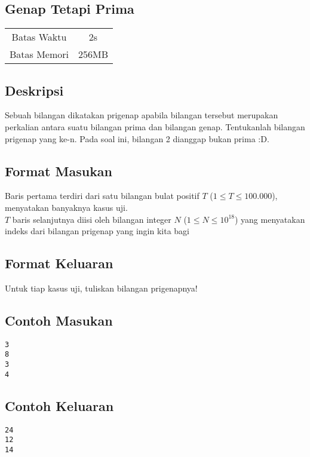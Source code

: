 \documentclass{article}
\begin{document}
\begin{center}

    
    \section*{Genap Tetapi Prima} %

    \begin{tabular}{ | c c | }
        \hline
        Batas Waktu  & 2s \\    %
        Batas Memori & 256MB \\  %
        \hline
    \end{tabular}
\end{center}

\subsection*{Deskripsi}
Sebuah bilangan dikatakan prigenap apabila bilangan tersebut merupakan perkalian antara suatu bilangan prima dan bilangan genap. Tentukanlah bilangan prigenap yang ke-n. Pada soal ini, bilangan 2 dianggap bukan prima :D.

\subsection*{Format Masukan}

Baris pertama terdiri dari satu bilangan bulat positif $T$ ($1 \leq T \leq 100.000$), menyatakan banyaknya kasus uji.\\
$T$ baris selanjutnya diisi oleh bilangan integer $N$ ($1 \leq N \leq 10^{18}$) yang menyatakan indeks dari bilangan prigenap yang ingin kita bagi

\subsection*{Format Keluaran}

Untuk tiap kasus uji, tuliskan bilangan prigenapnya!
\\

\begin{multicols}{2}
\subsection*{Contoh Masukan}
\begin{lstlisting}
3
8
3
4
\end{lstlisting}
\columnbreak
\subsection*{Contoh Keluaran}
\begin{lstlisting}
24
12
14
\end{lstlisting}
\vfill
\null
\end{multicols}
\end{document}
